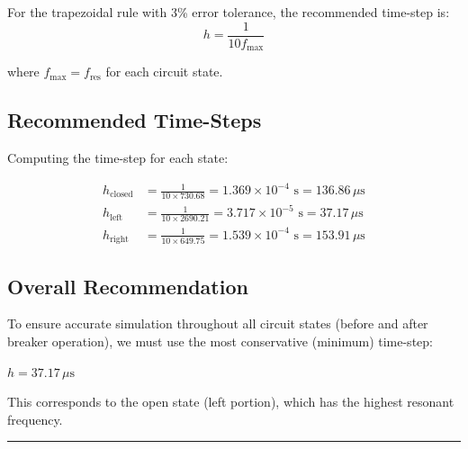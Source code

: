 For the trapezoidal rule with 3\% error tolerance, the recommended time-step is:
\begin{equation}
    h = \frac{1}{10 f_{\max}}
\end{equation}

where $f_{\max} = f_{\text{res}}$ for each circuit state.

\subsection{Recommended Time-Steps}

Computing the time-step for each state:

\begin{align}
    h_{\text{closed}} &= \frac{1}{10 \times 730.68} = 1.369\times 10^{-4}\text{ s} = 136.86\,\mu\text{s} \\
    h_{\text{left}} &= \frac{1}{10 \times 2690.21} = 3.717\times 10^{-5}\text{ s} = 37.17\,\mu\text{s} \\
    h_{\text{right}} &= \frac{1}{10 \times 649.75} = 1.539\times 10^{-4}\text{ s} = 153.91\,\mu\text{s}
\end{align}

\subsection{Overall Recommendation}

To ensure accurate simulation throughout all circuit states (before and after breaker operation), we must use the most conservative (minimum) time-step:

\begin{tcolorbox}[colback=blue!5!white, colframe=blue!75!black, title=\textbf{Simulation Time-Step Recommendation}]
\centering
\Large
$\boxed{h = 37.17\,\mu\text{s}}$

\vspace{0.3em}
\normalsize
This corresponds to the open state (left portion), which has the highest resonant frequency.
\end{tcolorbox}

\vspace{2em}
\noindent\rule{\textwidth}{0.4pt}
